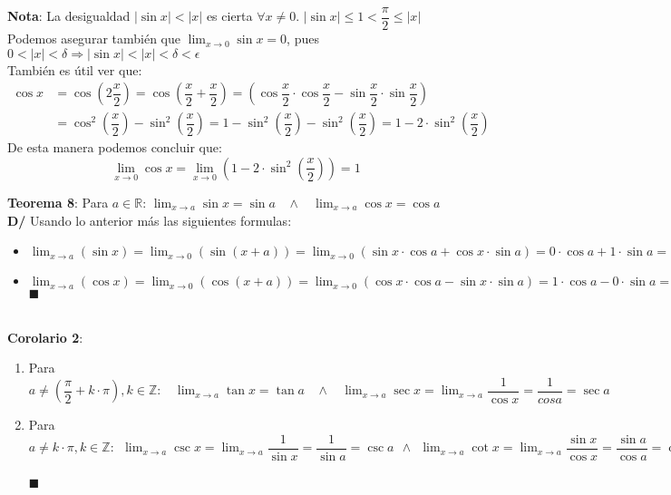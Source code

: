 \documentclass[11pt,a4paper]{article}
\newcommand*{\QEDA}{\null\nobreak\hfill\ensuremath{\blacksquare}}
\begin{document}
\noindent \textbf{Nota}: La desigualdad $|\sin x| < |x|$ es cierta $\forall x \not = 0$. $|\sin x| \leq 1 < \dfrac{\pi}{2} \leq |x|$\\

\noindent Podemos asegurar tambi\'en que $\displaystyle{\lim_{x\to 0} \sin x} = 0$, pues $0<|x|<\delta \Rightarrow |\sin x| < |x| < \delta < \epsilon$\\

\noindent Tambi\'en es \'util ver que:
\begin{align*}
\cos x &= \cos \left(2\dfrac{x}{2}\right) = \cos\left(\dfrac{x}{2} + \dfrac{x}{2}\right) = \left(\cos \dfrac{x}{2} \cdot \cos \dfrac{x}{2} - \sin \dfrac{x}{2} \cdot \sin \dfrac{x}{2}\right)\\
& = \cos^2 \left(\dfrac{x}{2}\right) - \sin^2 \left(\dfrac{x}{2}\right) = 1 - \sin^2 \left(\dfrac{x}{2}\right) - \sin^2 \left(\dfrac{x}{2}\right) = 1 - 2\cdot \sin^2 \left(\dfrac{x}{2}\right)
\end{align*}
De esta manera podemos concluir que:
$$\lim_{x\to 0}\cos x = \lim_{x\to 0}\left(1 - 2\cdot \sin^2 \left(\dfrac{x}{2}\right)\right) = 1$$

\vspace{1cm}

\noindent \textbf{Teorema 8}: Para $a \in \mathbb{R}$: \hfill $\lim_{x\to a}\sin x = \sin a \ \ \ \ \land \ \ \ \ \lim_{x\to a}\cos x = \cos a$ \hfill \hfill \\
\noindent \textbf{D/} Usando lo anterior m\'as las siguientes formulas:
\begin{itemize}
\item $\displaystyle{\lim_{x\to a}(\sin x) = \lim_{x\to 0} (\sin(x+a)) = \lim_{x\to 0} (\sin x \cdot \cos a + \cos x \cdot \sin a) = 0 \cdot \cos a + 1 \cdot \sin a = \sin a}$
\item $\displaystyle{\lim_{x\to a}(\cos x) = \lim_{x\to 0} (\cos(x+a)) = \lim_{x\to 0} (\cos x \cdot \cos a - \sin x \cdot \sin a) = 1 \cdot \cos a - 0 \cdot \sin a = \cos a}$ \QEDA \\ \\
\end{itemize}

\noindent \textbf{Corolario 2}: 
\begin{enumerate}
\item Para $a \not = \left(\dfrac{\pi}{2} + k\cdot \pi\right), k \in \mathbb{Z} : \ \ \ \ \displaystyle{\lim_{x\to a} \tan x = \tan a \ \ \ \ \land \ \ \ \ \lim_{x\to a}\sec x = \lim_{x\to a}\dfrac{1}{\cos x} = \dfrac{1}{cos a} = \sec a}$
\item Para $a \not = k\cdot \pi, k \in \mathbb{Z} : \ \ \displaystyle{\lim_{x\to a}\csc x = \lim_{x\to a}\dfrac{1}{\sin x} = \dfrac{1}{\sin a} = \csc a \ \ \land \ \ \lim_{x\to a}\cot x = \lim_{x\to a}\dfrac{\sin x}{\cos x} = \dfrac{\sin a}{\cos a} = \cot a}$\\ \\
\QEDA
\end{enumerate}
\end{document}
